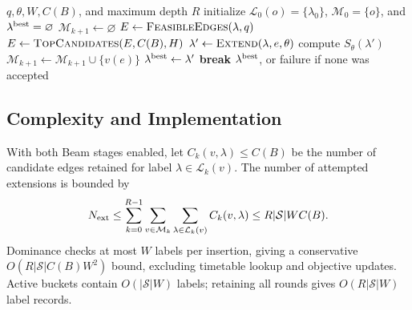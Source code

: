 \begin{algorithm}[t]
\caption{ReRAPTOR controlled value search}
\label{alg:reraptor}
\footnotesize
\begin{algorithmic}[1]
\Require \(q,\theta,W,C(B)\), and maximum depth \(R\)
\State initialize \(\mathcal L_0(o)=\{\lambda_0\}\), \(\mathcal M_0=\{o\}\), and \(\lambda^{\rm best}=\varnothing\)
    \State \(\mathcal M_{k+1}\gets\varnothing\)
        \State \(E\gets\Call{FeasibleEdges}{\lambda,q}\)
         \State \(E\gets\Call{TopCandidates}{E,C(B),H}\) \EndIf
            \State \(\lambda'\gets\Call{Extend}{\lambda,e,\theta}\)
                \State compute \(S_\theta(\lambda')\)
                        \State {}
                    \EndIf
                    \State \(\mathcal M_{k+1}\gets\mathcal M_{k+1}\cup\{v(e)\}\)
                        \State \(\lambda^{\rm best}\gets\lambda'\)
                    \EndIf
                \EndIf
            \EndIf
        \EndFor
    \EndFor
     \State \textbf{break} \EndIf
\EndFor
\State \Return \(\lambda^{\rm best}\), or failure if none was accepted
\end{algorithmic}
\end{algorithm}

\subsection{Complexity and Implementation}
With both Beam stages enabled, let \(C_k(v,\lambda)\leq C(B)\) be the number of
candidate edges retained for label \(\lambda\in\mathcal L_k(v)\). The number
of attempted extensions is bounded by
\begin{equation}
    \label{eq:expansion_bound}
    N_{\rm ext}\leq\sum_{k=0}^{R-1}\sum_{v\in\mathcal M_k}
    \sum_{\lambda\in\mathcal L_k(v)}C_k(v,\lambda)
    \leq R|\mathcal S|WC(B).
\end{equation}
Dominance checks at most \(W\) labels per insertion, giving a conservative
\(O(R|\mathcal S|C(B)W^2)\) bound, excluding timetable lookup and objective
updates. Active buckets contain \(O(|\mathcal S|W)\) labels; retaining all
rounds gives \(O(R|\mathcal S|W)\) label records.

